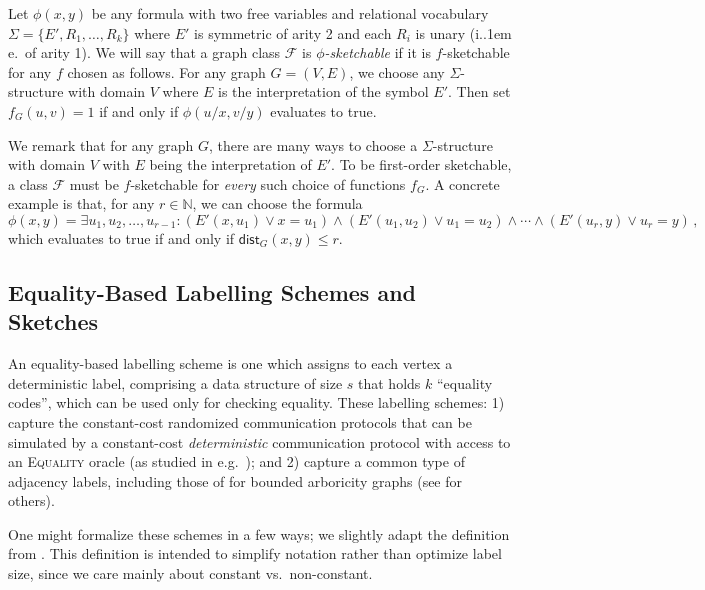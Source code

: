 \documentclass[11pt]{article}
\newcommand*\ie{i.\kern.1em e.\ }
\theoremstyle{definition}
\renewcommand{\leq}{\leqslant}
\def\F {{\mathcal F}}
\def\bN{{\mathbb N}}
\newcommand{\dist}{\mathsf{dist}}
\begin{document}
Let $\phi(x,y)$ be any formula with two free variables and relational vocabulary $\Sigma = \{ E',
R_1, \dotsc, R_k \}$ where $E'$ is symmetric of arity 2 and each $R_i$ is unary (\ie of arity 1). We
will say that a graph class $\F$ is \emph{$\phi$-sketchable} if it is $f$-sketchable for any $f$
chosen as follows. For any graph $G = (V,E)$, we choose any $\Sigma$-structure with domain $V$ where
$E$ is the interpretation of the symbol $E'$. Then set $f_G(u,v) = 1$ if and only if $\phi(u / x, v
/ y)$ evaluates to true.

We remark that for any graph $G$, there are many ways to choose a $\Sigma$-structure with domain $V$
with $E$ being the interpretation of $E'$. To be first-order sketchable, a class $\F$ must be
$f$-sketchable for \emph{every} such choice of functions $f_G$. A concrete example is that, for any
$r \in \bN$, we can choose the formula
\[
  \phi(x,y) = \exists u_1, u_2, \dotsc, u_{r-1} : (E'(x,u_1) \vee x=u_1) \wedge (E'(u_1,u_2) \vee
u_1=u_2) \wedge \dotsm \wedge (E'(u_r,y) \vee u_r=y) \,,
\]
which evaluates to true if and only if $\dist_G(x,y) \leq r$.


\subsection{Equality-Based Labelling Schemes and Sketches}\label{sec:dis}
An equality-based labelling scheme is one which assigns to each vertex a deterministic label,
comprising a data structure of size $s$ that holds $k$ ``equality codes''\!\!, which can be used
only for checking equality. These labelling schemes: 1) capture the
constant-cost randomized communication protocols that can be simulated by a constant-cost
\emph{deterministic} communication protocol with access to an \textsc{Equality} oracle (as studied
in e.g.~\cite{CLV19,BBM+20,HHH21b,HWZ21}); and 2) capture a common type of adjacency labels,
including those of \cite{KNR92} for bounded arboricity graphs (see \cite{HWZ21} for others).

One might formalize these schemes in a few ways; we slightly adapt the definition from
\cite{HWZ21}. This definition is intended to simplify notation rather than optimize label size,
since we care mainly about constant vs.~non-constant.
\end{document}

